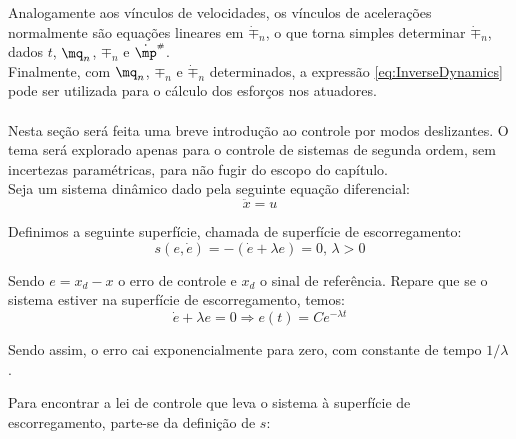 
Analogamente aos v\'inculos de velocidades, os v\'inculos de acelera\c{c}\~oes normalmente s\~ao equa\c{c}\~oes lineares em $\dot{\mp}_n$, o que torna simples determinar $\dot{\mp}_n$, dados $t$, $\mq_n$, $\mp_n$ e $\dot{\mp}\ssh$. \\

Finalmente, com $\mq_n$, $\mp_n$ e $\dot{\mp}_n$ determinados, a express\~ao \eqref{eq:InverseDynamics} pode ser utilizada para o c\'alculo dos esfor\c{c}os nos atuadores. \\


 
\\

Nesta se\c{c}\~ao ser\'a feita uma breve introdu\c{c}\~ao ao controle por modos deslizantes. O tema ser\'a explorado apenas para o controle de sistemas de segunda ordem, sem incertezas param\'etricas, para n\~ao fugir do escopo do cap\'itulo. \\

Seja um sistema din\^amico dado pela seguinte equa\c{c}\~ao diferencial:
\begin{equation} \label{eq:SimpleODE}
\ddot{x} = u
\end{equation}

Definimos a seguinte superf\'icie, chamada de superf\'icie de escorregamento:
\begin{equation} \label{eq:SlidingSurface}
s(e, \dot{e}) = - (\dot{e} + \lambda e) = 0, \, \lambda > 0
\end{equation}

Sendo $e = x_d - x$ o erro de controle e $x_d$ o sinal de refer\^encia. Repare que se o sistema estiver na superf\'icie de escorregamento, temos:
\begin{equation} \label{eq:SlidingError}
\dot{e} + \lambda e = 0 \Rightarrow e(t) = C e^{- \lambda t}
\end{equation}

Sendo assim, o erro cai exponencialmente para zero, com constante de tempo $1/\lambda$.

Para encontrar a lei de controle que leva o sistema \`a superf\'icie de escorregamento, parte-se da defini\c{c}\~ao de $s$:

